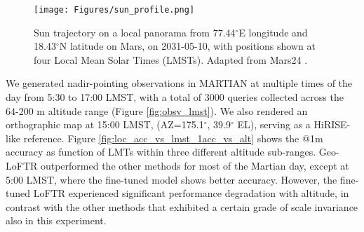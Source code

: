 \begin{figure}
\setlength{\abovecaptionskip}{0pt}  %
\setlength{\belowcaptionskip}{0pt}  %
\centering
\texttt{[image: Figures/sun\_profile.png]}
\caption{Sun trajectory on a local panorama from 77.44$^{\circ}$E longitude and 18.43$^{\circ}$N latitude on Mars, on 2031-05-10, with positions shown at four Local Mean Solar Times (LMSTs). Adapted from Mars24 \cite{mars24}.}
\label{fig:sun_profile}
\end{figure}

We generated nadir-pointing observations in MARTIAN at multiple times of the day from 5:30 to 17:00 LMST, with a total of 3000 queries collected across the 64-200 m altitude range (Figure \ref{fig:obsv_lmst}). We also rendered an orthographic map at 15:00 LMST, (AZ=175.1$^{\circ}$, 39.9$^{\circ}$ EL), serving as a HiRISE-like reference. 
Figure \ref{fig:loc_acc_vs_lmst_1acc_vs_alt} shows the @1m accuracy as function of LMTs within three different altitude sub-ranges. Geo-LoFTR outperformed the other methods for most of the Martian day, except at 5:00 LMST, where the fine-tuned model shows better accuracy. However, the fine-tuned LoFTR experienced significant performance degradation with altitude, in contrast with the other methods that exhibited a certain grade of scale invariance also in this experiment.


